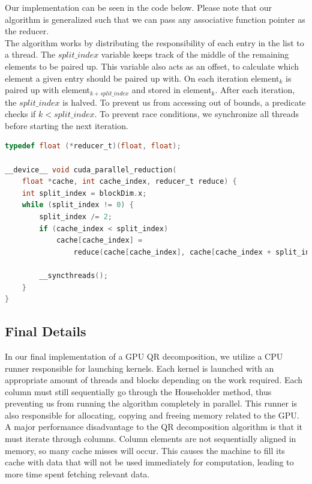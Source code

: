 Our implementation can be seen in the code below. Please note that our algorithm is generalized such that we can pass any associative function pointer as the reducer. \\
The algorithm works by distributing the responsibility of each entry in the list to a thread. The $split\_index$ variable keeps track of the middle of the remaining elements to be paired up. This variable also acts as an offset, to calculate which element a given entry should be paired up with. On each iteration element$_k$ is paired up with element$_{k + split\_index}$ and stored in element$_k$. After each iteration, the $split\_index$ is halved. To prevent us from accessing out of bounds, a predicate checks if $k < split\_index$. To prevent race conditions, we synchronize all threads before starting the next iteration. 

\begin{lstlisting}[language=C, caption={Parallel Reduction}, label={lst:parallel_reduce}]
typedef float (*reducer_t)(float, float);

__device__ void cuda_parallel_reduction(
    float *cache, int cache_index, reducer_t reduce) {
    int split_index = blockDim.x;
    while (split_index != 0) {
        split_index /= 2;
        if (cache_index < split_index)
            cache[cache_index] =
                reduce(cache[cache_index], cache[cache_index + split_index]);

        __syncthreads();
    }
}
\end{lstlisting}

\subsection*{Final Details}
In our final implementation of a GPU QR decomposition, we utilize a CPU runner responsible for launching kernels. Each kernel is launched with an appropriate amount of threads and blocks depending on the work required. Each column must still sequentially go through the Householder method, thus preventing us from running the algorithm completely in parallel. This runner is also responsible for allocating, copying and freeing memory related to the GPU. 
\\
A major performance disadvantage to the QR decomposition algorithm is that it must iterate through columns. Column elements are not sequentially aligned in memory, so many cache misses will occur. This causes the machine to fill its cache with data that will not be used immediately for computation, leading to more time spent fetching relevant data. 